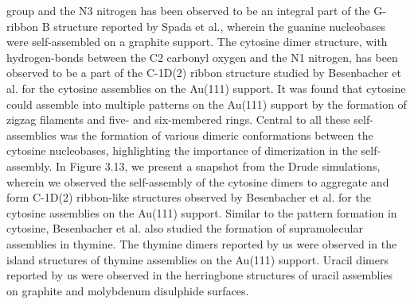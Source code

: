 group and the N3 nitrogen has been observed to be an integral part of the G-ribbon B structure reported by Spada et al.,\supercite{spada_guanosine-based_2008} wherein the guanine nucleobases were self-assembled on a graphite support. The cytosine dimer structure, with hydrogen-bonds between the C2 carbonyl oxygen and the N1 nitrogen, has been observed to be a part of the C-1D(2) ribbon structure studied by Besenbacher et al.\supercite{otero_elementary_2008} for the cytosine assemblies on the Au(111) support. It was found that cytosine could assemble into multiple patterns on the Au(111) support by the formation of zigzag filaments and five- and six-membered rings. Central to all these self-assemblies was the formation of various dimeric conformations between the cytosine nucleobases, highlighting the importance of dimerization in the self-assembly.  In Figure 3.13, we present a snapshot from the Drude simulations, wherein we observed the self-assembly of the cytosine dimers to aggregate and form C-1D(2) ribbon-like structures observed by Besenbacher et al.\supercite{otero_elementary_2008} for the cytosine assemblies on the Au(111) support. Similar to the pattern formation in cytosine, Besenbacher et al. also studied the formation of supramolecular assemblies in thymine.\supercite{xu_probing_2007} The thymine dimers reported by us were observed in the island structures of thymine assemblies on the Au(111) support. Uracil dimers reported by us were observed in the herringbone structures of uracil assemblies on graphite and molybdenum disulphide surfaces.\supercite{sowerby_scanning_1997,sowerby_molecular_1998}

